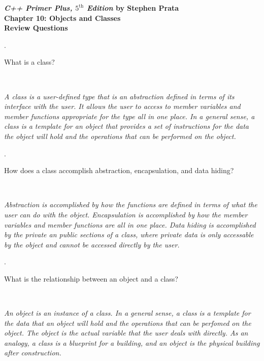 \documentclass{amsart}
\begin{document}
\begin{center}
	\Large {\bfseries
	\emph{C++ Primer Plus, $5^{\text{th}}$ Edition} by Stephen Prata \\
	Chapter 10: Objects and Classes \\
	Review Questions} \normalsize \vspace{5ex}
\end{center}


\phantom{\quad} \vfill
{}. 
\begin{minipage}[t]{11.5 cm}
	What is a class?
\end{minipage} \\[1ex]
\phantom{3. } 
\begin{minipage}[t]{11.5 cm}
	{\slshape 
	A class is a user-defined type that is an abstraction 
	defined in terms of its interface with the user. 
	It allows the user to access to member variables and 
	member functions appropriate for the type all in one
	place.
	In a general sense, a class is a template for an object
	that provides a set of instructions for the data the
	object will hold and the operations that can be performed
	on the object. 
	} 
\end{minipage} 
\vfill

. 
\begin{minipage}[t]{11.5 cm}
	How does a class accomplish abstraction, encapsulation, and data hiding?
\end{minipage} \\[1ex]
\phantom{2. } 
\begin{minipage}[t]{11.5 cm}
	{\slshape 
	Abstraction is accomplished by how the functions are
	defined in terms of what the user can do with the object. 
	Encapsulation is accomplished by how the member variables
	and member functions are all in one place.
	Data hiding is accomplished by the private an public
	sections of a class, where private data is only accessable
	by the object and cannot be accessed directly by the user.
	} 
\end{minipage} 
\vfill

. 
\begin{minipage}[t]{11.5 cm}
	What is the relationship between an object and a class?
\end{minipage} \\[1ex]
\phantom{3. } 
\begin{minipage}[t]{11.5 cm}
	{\slshape 
	An object is an instance of a class.
	In a general sense, a class is a template for the data that
	an object will hold and the operations that can be perfomed
	on the object.
	The object is the actual variable that the user deals with
	directly.
	As an analogy, a class is a blueprint for a building, 
	and an object is the physical building after construction.
	} 
\end{minipage} 
\vfill
\end{document}
